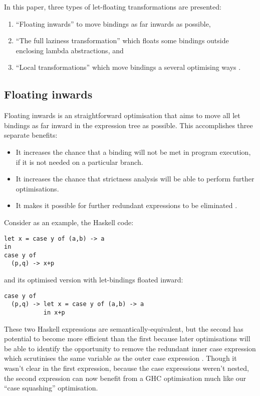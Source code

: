 In this paper, three types of let-floating transformations are presented:
\begin{enumerate}
\item ``Floating inwards'' to move bindings as far inwards as possible,
\item ``The full laziness transformation'' which floats some bindings outside enclosing lambda abstractions, and
\item ``Local transformations'' which move bindings a several optimising ways \citep{jones1996}.
\end{enumerate}

\subsection*{Floating inwards}

Floating inwards is an straightforward optimisation that aims to move all let bindings as far inward in the expression tree as possible. This accomplishes three separate benefits:
\begin{itemize}
\item It increases the chance that a binding will not be met in program execution, if it is not needed on a particular branch.
\item It increases the chance that strictness analysis will be able to perform further optimisations.
\item It makes it possible for further redundant expressions to be eliminated \citep{jones1996}.
\end{itemize}

Consider as an example, the Haskell code:
\begin{lstlisting}
let x = case y of (a,b) -> a
in
case y of
  (p,q) -> x+p
\end{lstlisting}

and its optimised version with let-bindings floated inward:
\begin{lstlisting}
case y of
  (p,q) -> let x = case y of (a,b) -> a
           in x+p
\end{lstlisting}

These two Haskell expressions are semantically-equivalent, but the second has potential to become more efficient than the first because later optimisations will be able to identify the opportunity to remove the redundant inner case expression which scrutinises the same variable as the outer case expression \citep{jones1996}. Though it wasn't clear in the first expression, because the case expressions weren't nested, the second expression can now benefit from a GHC optimisation much like our ``case squashing'' optimisation.

